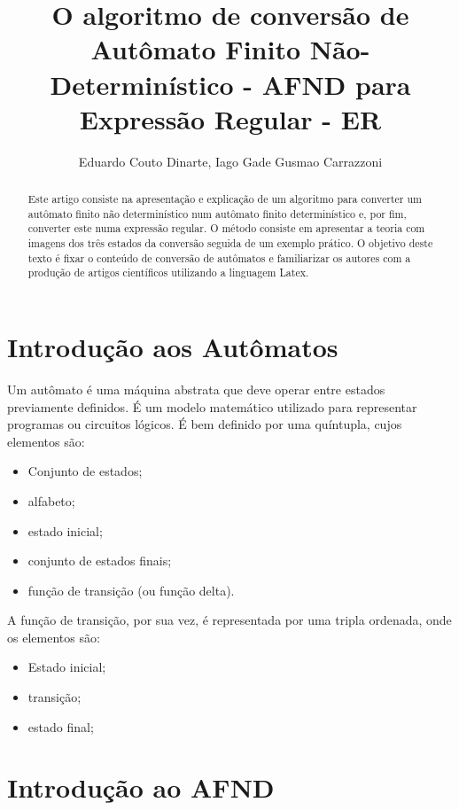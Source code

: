 \documentclass[a4paper,10pt]{article} %
\title{O algoritmo de conversão de Autômato Finito Não-Determinístico - AFND para Expressão Regular - ER}
\author{Eduardo Couto Dinarte, Iago Gade Gusmao Carrazzoni}
\begin{document}
\maketitle

\begin{abstract}

    Este artigo consiste na apresenta\c{c}\~{a}o e explica\c{c}\~{a}o de um algoritmo para converter um aut\^{o}mato finito n\~{a}o determin\'{i}stico num aut\^{o}mato finito determin\'{i}stico e, por fim, converter este numa express\~{a}o regular. O m\'{e}todo consiste em apresentar a teoria com imagens dos tr\^{e}s estados da convers\~{a}o seguida de um exemplo pr\'{a}tico. O objetivo deste texto \'{e} fixar o conte\'{u}do de convers\~{a}o de aut\^{o}matos e familiarizar os autores com a produ\c{c}\~{a}o de artigos cient\'{i}ficos utilizando a linguagem Latex.

\end{abstract}


\section{Introdução aos Autômatos}

    Um autômato é uma máquina abstrata que deve operar entre estados previamente definidos. É um modelo matemático utilizado para representar programas ou circuitos lógicos. É bem definido por uma quíntupla, cujos elementos são:
    \begin{itemize}
        \item Conjunto de estados;
        \item alfabeto;
        \item estado inicial;
        \item conjunto de estados finais;
        \item função de transição (ou função delta).
    \end{itemize}

A função de transição, por sua vez, é representada por uma tripla ordenada, onde os elementos são:
    \begin{itemize}
        \item Estado inicial;
        \item transição;
        \item estado final;
    \end{itemize}

\section{Introdução ao AFND}
\end{document}
